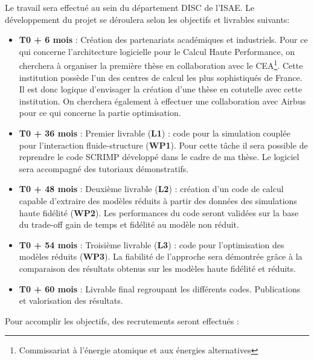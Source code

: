 \documentclass[12pt, french]{article}
\begin{document}
	Le travail sera effectué au sein du département DISC de l'ISAE. Le développement du projet se déroulera selon les objectifs et livrables suivants:
	\begin{itemize}
		\item \textbf{T0 + 6 mois} : Création des partenariats académiques et industriels.
		Pour ce qui concerne l'architecture logicielle pour le Calcul Haute Performance, on cherchera à organiser la première thèse en collaboration avec le CEA\footnote{Commissariat à l'énergie atomique et aux énergies alternatives}. Cette institution possède l'un des centres de calcul les plus sophistiqués de France. Il est donc logique d'envisager la création d'une thèse en cotutelle avec cette institution. On cherchera également à effectuer une collaboration avec Airbus pour ce qui concerne la partie optimisation.
		\item \textbf{T0 + 36 mois} : Premier livrable (\textbf{L1}) : code pour la simulation couplée pour l'interaction fluide-structure (\textbf{WP1}). Pour cette t\^ache il sera possible de reprendre le code SCRIMP développé dans le cadre de ma thèse. Le logiciel sera accompagné des tutoriaux démonstratifs.
		\item \textbf{T0 + 48 mois} : Deuxième livrable (\textbf{L2}) : création d'un code de calcul capable d'extraire des modèles réduits à partir des données des simulations haute fidélité (\textbf{WP2}). Les performances du code seront validées sur la base du trade-off gain de temps et fidélité au modèle non réduit.
		\item \textbf{T0 + 54 mois} : Troisième livrable (\textbf{L3}) : code pour l'optimisation des modèles réduits (\textbf{WP3}). La fiabilité de l'approche sera démontrée grâce à la comparaison des résultats obtenus sur les modèles haute fidélité et réduits. 
		\item \textbf{T0 + 60 mois} : Livrable final regroupant les différents codes. 		Publications et valorisation des résultats. 
	\end{itemize} 
\vspace{5pt}
Pour accomplir les objectifs, des recrutements seront effectués :
\end{document}
